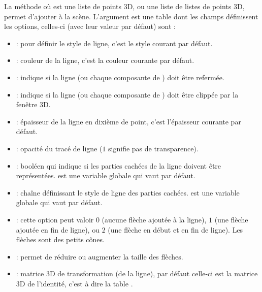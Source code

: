 La méthode  où  est une liste de points 3D, ou une liste de listes de points 3D, permet d'ajouter  à la scène. L'argument  est une table dont les champs définissent les options, celles-ci (avec leur valeur par défaut) sont :
    \begin{itemize}
        \item {} : pour définir le style de ligne, c'est le style courant par défaut.
        
        \item {} : couleur de la ligne, c'est la couleur courante par défaut.
        
        \item {} : indique si la ligne  (ou chaque composante de ) doit être refermée.
        
        \item {} : indique si la ligne  (ou chaque composante de ) doit être clippée par la fenêtre 3D.
        
        \item {} : épaisseur de la ligne en dixième de point, c'est l'épaisseur courante par défaut.
        
        \item {} : opacité du tracé de ligne ($1$ signifie pas de transparence).
        
        \item {} : booléen qui indique si les parties cachées de la ligne doivent être représentées.  est une variable globale qui vaut \false par défaut.
        
        \item {} : chaîne définissant le style de ligne des parties cachées.  est une variable globale qui vaut  par défaut.
        
        \item {} : cette option peut valoir $0$ (aucune flèche ajoutée à la ligne), $1$ (une flèche ajoutée en fin de ligne), ou $2$ (une flèche en début et en fin de ligne). Les flèches sont des petits cônes.
        
        \item {} : permet de réduire ou augmenter la taille des flèches.
        
        \item {} : matrice 3D de transformation (de la ligne), par défaut celle-ci est la matrice 3D de l'identité, c'est à dire la table .
    \end{itemize}
    
